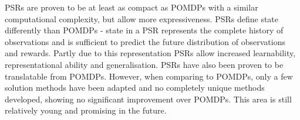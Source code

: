 PSRs are proven to be at least as compact as POMDPs with a similar
computational complexity, but allow more expressiveness. PSRs define state
differently than POMDPs - state in a PSR represents the complete history of
observations and is sufficient to predict the future distribution of
observations and rewards. Partly due to this representation PSRs allow
increased learnability, representational ability and generalisation. PSRs have
also been proven to be translatable from POMDPs. However, when comparing to
POMDPs, only a few solution methods have been adapted and no completely unique
methods developed, showing no significant improvement over POMDPs. This area is
still relatively young and promising in the future.
\parencite{Wingate2012ai+psr}


